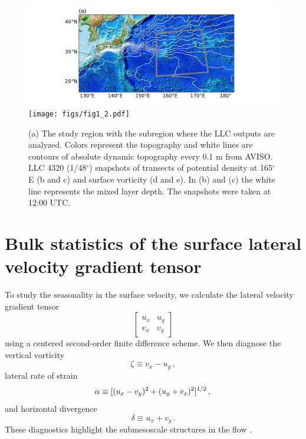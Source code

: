 \documentclass[grl]{agutex2015}
\begin{document}
\begin{article}
\begin{figure}[ht]
\begin{center}
\hspace{-1.25cm}\includegraphics[width=.7\textwidth]{figs/fig1_1.pdf}\\
\vspace{-.125cm}
\texttt{[image: figs/fig1\_2.pdf]}
 \caption{\small (a) The study region with the subregion where the LLC outputs are
          analyzed. Colors represent the topography and white lines are contours of absolute
          dynamic topography every 0.1 m from AVISO. LLC 4320 (1/48$^\circ$) snapshots of
          transects
          of potential density at 165$^\circ$E (b and c) and  surface vorticity (d and e).
          In (b) and (c) the white line represents the mixed layer depth. The snapshots were
          taken at 12:00 UTC.}
\vspace{-1.5cm}
 \label{fig1}
 \end{center}
 \end{figure}

\section{Bulk statistics of the surface lateral velocity gradient tensor}
To study the seasonality in the surface velocity, we calculate the lateral velocity gradient tensor
\begin{equation}
\left[\begin{matrix} u_x & u_y\\ v_x&v_y \end{matrix}\right]
\end{equation}
using a centered
second-order finite difference scheme. We then diagnose
the vertical vorticity
\begin{equation}
\zeta \equiv v_x - u_y\, ,
\end{equation}
lateral rate of strain
\begin{equation}
  \alpha \equiv [(u_x-v_y)^2 + (u_y + v_x)^2]^{1/2}\,,\\
\end{equation}
and horizontal divergence
\begin{equation}
\delta \equiv u_x + v_y\, .
\end{equation}
These diagnostics highlight the submesoscale structures in the flow
\citep[e.g.,][]{shcherbina_etal2013}.


\end{article}
\end{document}
